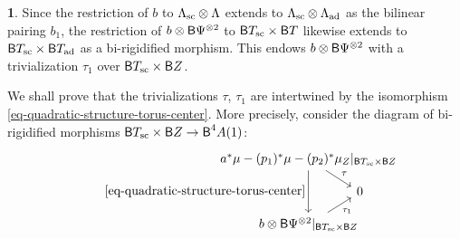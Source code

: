 \documentclass[10pt,english,reqno]{amsart}
\newcommand{\deloop}{\textnormal{\textsf{B}}}
\newcommand{\sconn}{\textnormal{sc}}
\newcommand{\adjoint}{\textnormal{ad}}
\theoremstyle{definition}
\numberwithin{equation}{section}
\newtheorem{untitledsubsubsection}[subsubsection]{}
\newenvironment{void}
{\begin{untitledsubsubsection}}
{\end{untitledsubsubsection}}
\begin{document}
\begin{void}
Since the restriction of $b$ to $\Lambda_{\sconn}\otimes \Lambda$ extends to $\Lambda_{\sconn} \otimes \Lambda_{\adjoint}$ as the bilinear pairing $b_1$, the restriction of $b\otimes \deloop\Psi^{\otimes 2}$ to $\deloop T_{\sconn} \times \deloop T$ likewise extends to $\deloop T_{\sconn} \times \deloop T_{\adjoint}$ as a bi-rigidified morphism. This endows $b\otimes \deloop\Psi^{\otimes 2}$ with a trivialization $\tau_1$ over $\deloop T_{\sconn} \times \deloop Z$.

We shall prove that the trivializations $\tau$, $\tau_1$ are intertwined by the isomorphism \eqref{eq-quadratic-structure-torus-center}. More precisely, consider the diagram of bi-rigidified morphisms $\deloop T_{\sconn} \times \deloop Z \rightarrow \deloop^4A(1)$:
\begin{equation}
\label{eq-sconn-center-compatibility}
\begin{tikzcd}[column sep = -4em, row sep = 1em]
	a^*\mu - (p_1)^*\mu - (p_2)^*\mu_Z|_{\deloop T_{\sconn}\times \deloop Z} \ar[dr, "\tau"]\ar[dd, swap, "\eqref{eq-quadratic-structure-torus-center}"] & \\
	& 0 \\
	b\otimes \deloop\Psi^{\otimes 2}|_{\deloop T_{\sconn} \times \deloop Z} \ar[ur, swap, "\tau_1"]
\end{tikzcd}
\end{equation}
\end{void}

\end{document}
